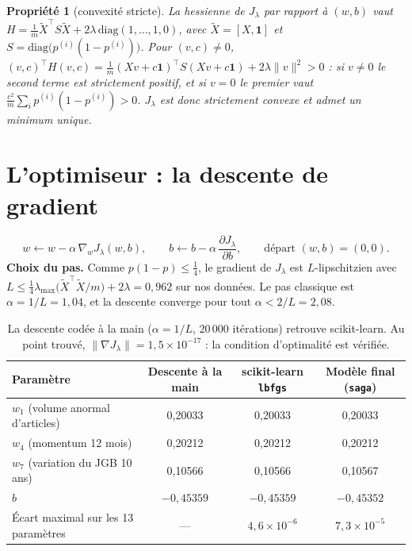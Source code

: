 \documentclass[11pt,a4paper]{article}
\newtheorem*{prop}{Propriété}
\begin{document}
\begin{prop}[convexité stricte]
La hessienne de $J_\lambda$ par rapport à $(w,b)$ vaut
$H=\frac1m\tilde X^\top S\tilde X+2\lambda\,\mathrm{diag}(1,\dots,1,0)$, avec $\tilde X=[X,\mathbf 1]$ et
$S=\mathrm{diag}\big(p^{(i)}(1-p^{(i)})\big)$. Pour $(v,c)\neq0$,
$(v,c)^\top H(v,c)=\frac1m(Xv+c\mathbf 1)^\top S(Xv+c\mathbf 1)+2\lambda\lVert v\rVert^2>0$ : si $v\neq0$ le second terme
est strictement positif, et si $v=0$ le premier vaut $\frac{c^2}m\sum_i p^{(i)}(1-p^{(i)})>0$. $J_\lambda$ est donc
strictement convexe et admet un minimum unique.
\end{prop}

\section{L'optimiseur : la descente de gradient}

\[
w\leftarrow w-\alpha\,\nabla_wJ_\lambda(w,b),\qquad b\leftarrow b-\alpha\,\frac{\partial J_\lambda}{\partial b},\qquad\text{départ } (w,b)=(0,0).
\]
\textbf{Choix du pas.} Comme $p(1-p)\le\frac14$, le gradient de $J_\lambda$ est $L$-lipschitzien avec
$L\le\frac14\lambda_{\max}\big(\tilde X^\top\tilde X/m\big)+2\lambda=0{,}962$ sur nos données. Le pas classique est
$\alpha=1/L=1{,}04$, et la descente converge pour tout $\alpha<2/L=2{,}08$.

\begin{table}[H]\centering\small
\begin{tabular}{lccc}\toprule
Paramètre & Descente à la main & scikit-learn \texttt{lbfgs} & Modèle final (\texttt{saga}) \\\midrule
$w_1$ (volume anormal d'articles) & 0,20033 & 0,20033 & 0,20033 \\
$w_4$ (momentum 12 mois) & 0,20212 & 0,20212 & 0,20212 \\
$w_7$ (variation du JGB 10 ans) & 0,10566 & 0,10566 & 0,10567 \\
$b$ & $-0{,}45359$ & $-0{,}45359$ & $-0{,}45352$ \\\midrule
Écart maximal sur les 13 paramètres & --- & $4{,}6\times10^{-6}$ & $7{,}3\times10^{-5}$ \\\bottomrule
\end{tabular}
\caption{La descente codée à la main ($\alpha=1/L$, 20\,000 itérations) retrouve scikit-learn. Au point trouvé, $\lVert\nabla J_\lambda\rVert=1{,}5\times10^{-17}$ :
la condition d'optimalité est vérifiée.}
\end{table}
\end{document}
